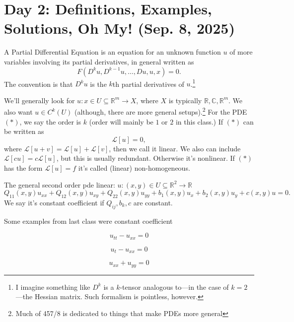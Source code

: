 \section{Day 2: Definitions, Examples, Solutions, Oh My! (Sep. 8, 2025)}
\begin{definition}
A Partial Differential Equation is an equation for an unknown function \( u \) of more variables involving its partial derivatives, in general written as
\[\tag{\( * \)} F \left( D^{k} u, D^{k-1} u, \ldots, D u, u, x \right) = 0. \]
The convention is that \( D^{k} u \) is the \( k \)th partial derivatives of \( u \).\footnote{I imagine something like \( D^{k} \) is a \( k \)-tensor analogous to---in the case of \( k = 2 \)---the Hessian matrix. Such formalism is pointless, however.} 
\end{definition}
We'll  generally look for \( u : x \in U \subseteq \mathbb{R}^{m} \to X \), where \( X \) is typically \( \mathbb{R}, \mathbb{C}, \mathbb{R}^{m} \). We also want \( u \in C^{k}(U) \) (although, there are more general setups).\footnote{Much of 457/8 is dedicated to things that make PDEs more general} For the PDE \( (*) \), we say the order is \( k \) (order will mainly be \( 1 \) or \( 2 \) in this class.) If \( (*) \) can be written as
\[ \mathcal{L}[u] = 0, \]
where \( \mathcal{L}[u + v] = \mathcal{L}[u] + \mathcal{L}[v] \), then we call it linear. We also can include \( \mathcal{L}[cu] = c\mathcal{L}[u] \), but this is usually redundant. Otherwise it's nonlinear. If \( (*) \) has the form \( \mathcal{L}[u] = f \) it's called (linear) non-homogeneous. 
\begin{example}
The general second order pde linear: \( u : (x, y) \in U \subseteq \mathbb{R}^{2} \to \mathbb{R} \)
\[ Q_{11}(x, y) u_{x x} + Q_{12}(x, y) u_{xy} + Q_{22}(x, y) u_{yy} + b_{1}(x, y) u_{x} + b_{2}(x, y) u_{y} + c(x, y) u = 0. \]
We say it's constant coefficient if \( Q_{ij}, b_{k}, c  \) are constant.
\end{example} 

\noindent Some examples from last class were constant coefficient
\begin{example}
\[ u_{tt} - u_{x x} = 0 \]
\end{example}

\begin{example}
\[ u_{t} - u_{x x} = 0 \]
	
\end{example}

\begin{example}
\[ u_{x x} + u_{y y} = 0 \]
	
\end{example}

